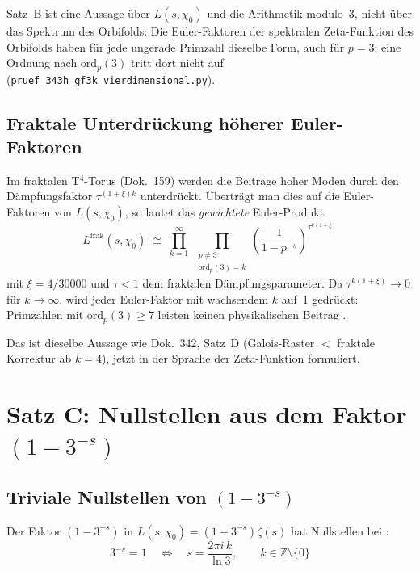 Satz~B ist eine Aussage über $L(s,\chi_0)$ und die Arithmetik modulo~3, nicht
über das Spektrum des Orbifolds: Die Euler-Faktoren der spektralen Zeta-Funktion
des Orbifolds haben für jede ungerade Primzahl dieselbe Form, auch für $p=3$;
eine Ordnung nach $\mathrm{ord}_p(3)$ tritt dort nicht auf
(\texttt{pruef\_343h\_gf3k\_vierdimensional.py}).

\subsection{Fraktale Unterdrückung höherer Euler-Faktoren}

Im fraktalen T$^4$-Torus (Dok.~159) werden die Beiträge hoher Moden durch den
Dämpfungsfaktor $\tau^{(1+\xi)k}$ unterdrückt. Überträgt man dies auf die
Euler-Faktoren von $L(s,\chi_0)$, so lautet das \emph{gewichtete} Euler-Produkt
\begin{equation}
  L^{\mathrm{frak}}(s,\chi_0)
  \;\cong\; \prod_{k=1}^{\infty}\;
  \prod_{\substack{p\neq 3\\ \mathrm{ord}_p(3)=k}}
  \left(\frac{1}{1-p^{-s}}\right)^{\!\tau^{k(1+\xi)}}
\end{equation}
mit $\xi = 4/30000$ und $\tau < 1$ dem fraktalen Dämpfungsparameter.
Da $\tau^{k(1+\xi)} \to 0$ für $k \to \infty$, wird jeder Euler-Faktor
mit wachsendem $k$ auf~1 gedrückt: Primzahlen mit $\mathrm{ord}_p(3) \geq 7$
leisten keinen physikalischen Beitrag \BM.

Das ist dieselbe Aussage wie Dok.~342, Satz~D (Galois-Raster $<$ fraktale
Korrektur ab $k=4$), jetzt in der Sprache der Zeta-Funktion formuliert.

\section{Satz C: Nullstellen aus dem Faktor $(1-3^{-s})$}

\subsection{Triviale Nullstellen von $(1-3^{-s})$}

Der Faktor $(1-3^{-s})$ in $L(s,\chi_0) = (1-3^{-s})\zeta(s)$
hat Nullstellen bei \BM:
\begin{equation}
  3^{-s} = 1 \quad\Longleftrightarrow\quad s = \frac{2\pi i\, k}{\ln 3},
  \qquad k \in \mathbb{Z} \setminus \{0\}
\end{equation}

